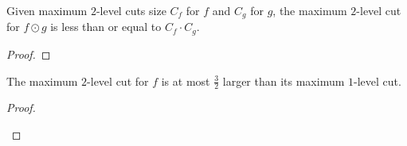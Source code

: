 \documentclass[english, aspectratio=169]{beamer}
\begin{document}
\begin{frame}
  \begin{theorem}
    Given maximum $2$-level cuts size $C_f$ for $f$ and $C_g$ for $g$, the
    maximum $2$-level cut for $f \odot g$ is less than or equal to
    $C_f \cdot C_g$.
  \end{theorem}

  \begin{proof}

    \vspace{2pt} %
  \end{proof}
\end{frame}

\begin{frame}
  \begin{lemma}
    The maximum $2$-level cut for $f$ is at most $\tfrac{3}{2}$ larger
    than its maximum $1$-level cut.
  \end{lemma}
  \vspace{14pt}
  \begin{proof}

    \begin{center}
      
    \end{center}
  \end{proof}
\end{frame}
\end{document}
